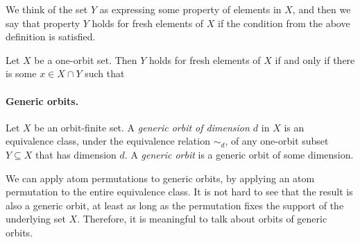 We think of the set $Y$ as expressing some property of elements in $X$, and then we say that property $Y$ holds for fresh elements of $X$ if the condition from the above definition is satisfied.

\begin{lemma}
    Let $X$ be a one-orbit set. Then $Y$ holds for fresh elements of $X$ if and only if there is some $x \in X \cap Y$ such that 
    
\end{lemma}

\paragraph*{Generic orbits.}
\begin{definition}
     \label{def:generic-orbit} Let $X$ be an orbit-finite set. A \emph{generic orbit of dimension $d$} in $X$ is an equivalence class, under the equivalence relation $\sim_d$, of any one-orbit subset $Y \subseteq X$ that has dimension $d$. A \emph{generic orbit} is a generic orbit of some dimension.
\end{definition}

We can apply atom permutations to generic orbits, by applying an atom permutation to the entire equivalence class. It is not hard to see that the result is also a generic orbit, at least as long as the permutation fixes the support of the underlying set $X$. Therefore, it is meaningful to talk about orbits of generic orbits.



